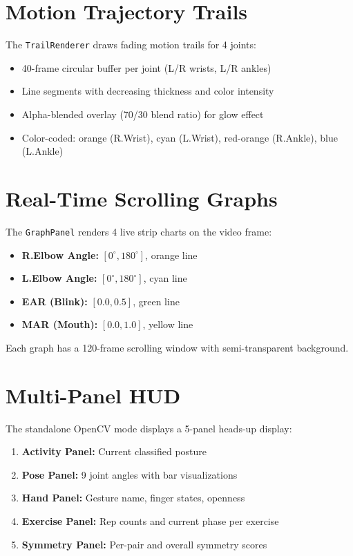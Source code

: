 \documentclass[a4paper,12pt]{report}
\begin{document}
\section{Motion Trajectory Trails}
The \texttt{TrailRenderer} draws fading motion trails for 4 joints:
\begin{itemize}
    \item 40-frame circular buffer per joint (L/R wrists, L/R ankles)
    \item Line segments with decreasing thickness and color intensity
    \item Alpha-blended overlay (70/30 blend ratio) for glow effect
    \item Color-coded: orange (R.Wrist), cyan (L.Wrist), red-orange (R.Ankle), blue (L.Ankle)
\end{itemize}

\section{Real-Time Scrolling Graphs}
The \texttt{GraphPanel} renders 4 live strip charts on the video frame:
\begin{itemize}
    \item \textbf{R.Elbow Angle:} $[0^{\circ}, 180^{\circ}]$, orange line
    \item \textbf{L.Elbow Angle:} $[0^{\circ}, 180^{\circ}]$, cyan line
    \item \textbf{EAR (Blink):} $[0.0, 0.5]$, green line
    \item \textbf{MAR (Mouth):} $[0.0, 1.0]$, yellow line
\end{itemize}
Each graph has a 120-frame scrolling window with semi-transparent background.

\section{Multi-Panel HUD}
The standalone OpenCV mode displays a 5-panel heads-up display:
\begin{enumerate}
    \item \textbf{Activity Panel:} Current classified posture
    \item \textbf{Pose Panel:} 9 joint angles with bar visualizations
    \item \textbf{Hand Panel:} Gesture name, finger states, openness
    \item \textbf{Exercise Panel:} Rep counts and current phase per exercise
    \item \textbf{Symmetry Panel:} Per-pair and overall symmetry scores
\end{enumerate}
\end{document}
